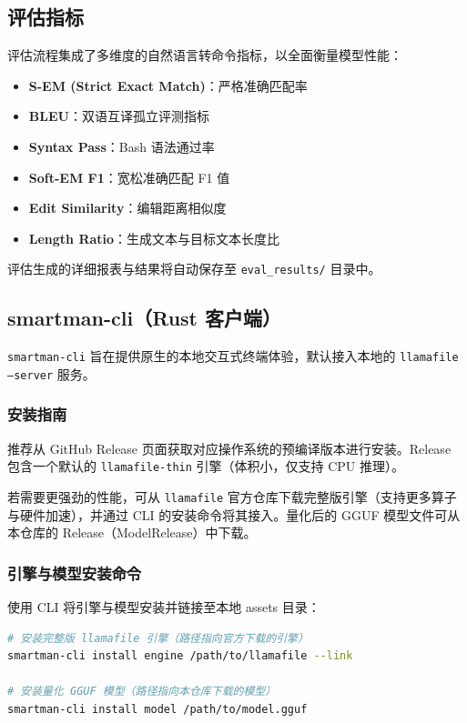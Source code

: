 \documentclass[UTF8,a4paper,12pt]{ctexart}
\begin{document}
\subsection{评估指标}
评估流程集成了多维度的自然语言转命令指标，以全面衡量模型性能：
\begin{itemize}
    \item \textbf{S-EM (Strict Exact Match)}：严格准确匹配率
    \item \textbf{BLEU}：双语互译孤立评测指标
    \item \textbf{Syntax Pass}：Bash 语法通过率
    \item \textbf{Soft-EM F1}：宽松准确匹配 F1 值
    \item \textbf{Edit Similarity}：编辑距离相似度
    \item \textbf{Length Ratio}：生成文本与目标文本长度比
\end{itemize}
评估生成的详细报表与结果将自动保存至 \texttt{eval\_results/} 目录中。

\subsection{smartman-cli（Rust 客户端）}
\texttt{smartman-cli} 旨在提供原生的本地交互式终端体验，默认接入本地的 \texttt{llamafile --server} 服务。

\subsubsection{安装指南}
推荐从 GitHub Release 页面获取对应操作系统的预编译版本进行安装。Release 包含一个默认的 \texttt{llamafile-thin} 引擎（体积小，仅支持 CPU 推理）。

若需要更强劲的性能，可从 \texttt{llamafile} 官方仓库下载完整版引擎（支持更多算子与硬件加速），并通过 CLI 的安装命令将其接入。量化后的 GGUF 模型文件可从本仓库的 Release（ModelRelease）中下载。

\subsubsection{引擎与模型安装命令}
使用 CLI 将引擎与模型安装并链接至本地 assets 目录：

\begin{lstlisting}[language=bash]
# 安装完整版 llamafile 引擎（路径指向官方下载的引擎）
smartman-cli install engine /path/to/llamafile --link

# 安装量化 GGUF 模型（路径指向本仓库下载的模型）
smartman-cli install model /path/to/model.gguf
\end{lstlisting}
\end{document}
